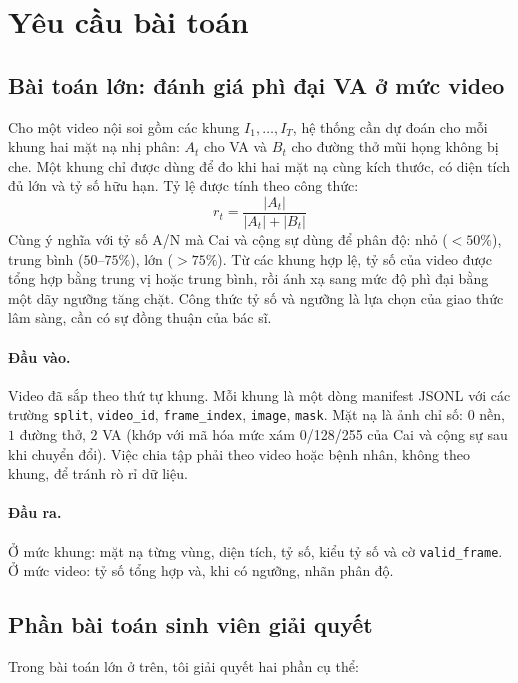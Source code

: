 \documentclass[a4paper,12pt]{report}
\begin{document}
\section{Yêu cầu bài toán}
\subsection{Bài toán lớn: đánh giá phì đại VA ở mức video}

Cho một video nội soi gồm các khung $I_1,\ldots,I_T$, hệ thống cần dự đoán cho mỗi khung hai mặt nạ nhị phân: $A_t$ cho VA và $B_t$ cho đường thở mũi họng không bị che. Một khung chỉ được dùng để đo khi hai mặt nạ cùng kích thước, có diện tích đủ lớn và tỷ số hữu hạn. Tỷ lệ được tính theo công thức:
\[
r_t=\frac{|A_t|}{|A_t|+|B_t|}
\]
Cùng ý nghĩa với tỷ số A/N mà Cai và cộng sự \cite{cai2024} dùng để phân độ: nhỏ ($<50\%$), trung bình ($50$--$75\%$), lớn ($>75\%$). Từ các khung hợp lệ, tỷ số của video được tổng hợp bằng trung vị hoặc trung bình, rồi ánh xạ sang mức độ phì đại bằng một dãy ngưỡng tăng chặt. Công thức tỷ số và ngưỡng là lựa chọn của giao thức lâm sàng, cần có sự đồng thuận của bác sĩ.

\paragraph{Đầu vào.} Video đã sắp theo thứ tự khung. Mỗi khung là một dòng manifest JSONL với các trường \texttt{split}, \texttt{video\_id}, \texttt{frame\_index}, \texttt{image}, \texttt{mask}. Mặt nạ là ảnh chỉ số: $0$ nền, $1$ đường thở, $2$ VA (khớp với mã hóa mức xám 0/128/255 của Cai và cộng sự sau khi chuyển đổi). Việc chia tập phải theo video hoặc bệnh nhân, không theo khung, để tránh rò rỉ dữ liệu.

\paragraph{Đầu ra.} Ở mức khung: mặt nạ từng vùng, diện tích, tỷ số, kiểu tỷ số và cờ \texttt{valid\_frame}. Ở mức video: tỷ số tổng hợp và, khi có ngưỡng, nhãn phân độ.

\subsection{Phần bài toán sinh viên giải quyết}

Trong bài toán lớn ở trên, tôi giải quyết hai phần cụ thể:
\end{document}
